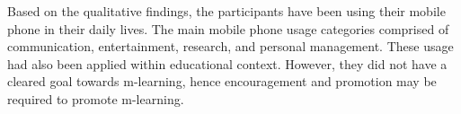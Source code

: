 Based on the qualitative findings, the participants have been using their mobile phone in their daily lives. The main mobile phone usage categories comprised of communication, entertainment, research, and personal management. These usage had also been applied within educational context. However, they did not have a cleared goal towards m-learning, hence encouragement and promotion may be required to promote m-learning. 









